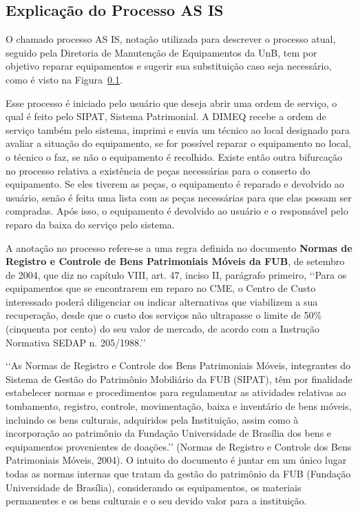 
\subsection{Explicação do Processo AS IS}
\label{processo-as-is}

O chamado processo AS IS, notação utilizada para descrever o processo atual, seguido pela Diretoria de Manutenção de Equipamentos da UnB, tem por objetivo reparar equipamentos e sugerir sua substituição caso seja necessário, como é visto na Figura~\ref{processo-as-is}.

Esse processo é iniciado pelo usuário que deseja abrir uma ordem de serviço, o qual é feito pelo SIPAT, Sistema Patrimonial. A DIMEQ recebe a ordem de serviço também pelo sistema, imprimi e envia um técnico ao local designado para avaliar a situação do equipamento, se for possível reparar o equipamento no local, o técnico o faz, se não o equipamento é recolhido. Existe então outra bifurcação no processo relativa a existência de peças necessárias para o conserto do equipamento. Se eles tiverem as peças, o equipamento é reparado e devolvido ao usuário, senão é feita uma lista com as peças necessárias para que elas possam ser compradas. Após isso, o equipamento é devolvido ao usuário e o responsável pelo reparo da baixa do serviço pelo sistema.

A anotação no processo refere-se a uma regra definida no documento \textbf{Normas de Registro e Controle de Bens Patrimoniais Móveis da FUB}, de setembro de 2004, que diz no capítulo VIII,  art. 47, inciso II, parágrafo primeiro, \lq\lq Para os equipamentos que se encontrarem em reparo no CME, o Centro de Custo interessado poderá diligenciar ou indicar alternativas que viabilizem a sua recuperação, desde que o custo dos serviços não ultrapasse o limite de 50\% (cinquenta por cento) do seu valor de mercado, de acordo com a Instrução Normativa SEDAP n. 205/1988.\rq\rq

{\lq\lq As Normas de Registro e Controle dos Bens Patrimoniais Móveis, integrantes do Sistema de Gestão do Patrimônio Mobiliário da FUB (SIPAT), têm por finalidade estabelecer normas e procedimentos para regulamentar as atividades relativas ao tombamento, registro, controle, movimentação, baixa e inventário de bens móveis, incluindo os bens culturais, adquiridos pela Instituição, assim como à incorporação ao patrimônio da Fundação Universidade de Brasília dos bens e equipamentos provenientes de doações.\rq\rq} (Normas de Registro e Controle dos Bens Patrimoniais Móveis, 2004). O intuito do documento é juntar em um único lugar todas as normas internas que tratam da gestão do patrimônio da FUB (Fundação Universidade de Brasília), considerando os equipamentos, os materiais permanentes e os bens culturais e o seu devido valor para a instituição.


